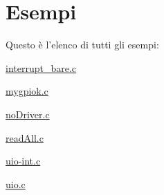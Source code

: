 \section{Esempi}
Questo è l'elenco di tutti gli esempi\+:\begin{DoxyCompactItemize}
\item 
\hyperlink{interrupt_bare_8c-example}{interrupt\+\_\+bare.\+c}
\item 
\hyperlink{mygpiok_8c-example}{mygpiok.\+c}
\item 
\hyperlink{no_driver_8c-example}{no\+Driver.\+c}
\item 
\hyperlink{read_all_8c-example}{read\+All.\+c}
\item 
\hyperlink{uio-int_8c-example}{uio-\/int.\+c}
\item 
\hyperlink{uio_8c-example}{uio.\+c}
\end{DoxyCompactItemize}
